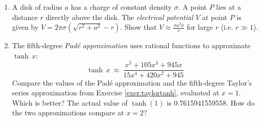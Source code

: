 {\begin{enumerate}[item-label={\bfseries \arabic*.}]
 \item A disk of radius $a$ has a charge of constant density $\sigma$. A point
 $P$ lies at a distance $r$ directly above the disk. The
 \emph{electrical potential} $V$ at point $P$ is given by
 $V = 2\pi\sigma(\sqrt{r^2 + a^2} - r)$. Show that
 $V \approx \frac{\pi a^2 \sigma}{r}$ for large $r$ (i.e. $r \gg 1$).
 \item The fifth-degree \emph{Pad\'{e} approximation} uses rational functions to
  approximate $\tanh\,x$:
\[
 \tanh\,x ~\approx~ \frac{x^5 + 105x^3 + 945x}{15x^4 + 420x^2 + 945}
\]
 Compare the values of the Pad\'{e} approximation and the fifth-degree Taylor's
 series approximation from Exercise \ref{exer:taylortanh}, evaluated at $x=1$.
 Which is better? The actual value of $\tanh (1)$ is 0.7615941559558. How do
 the two approximations compare at $x=2$?
\end{enumerate}


}

